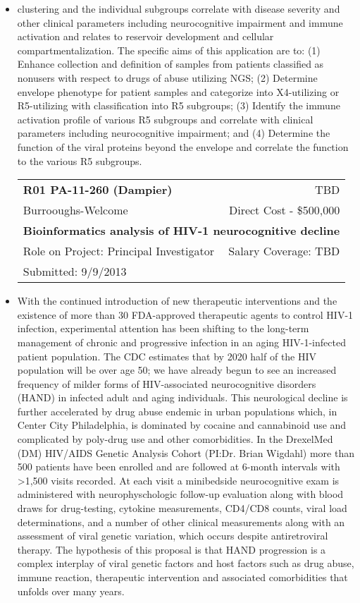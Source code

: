 \documentclass[a4paper,11pt]{article}
\makeatletter
\newenvironment{fullwidth}
    {\par
     \setlength{\@totalleftmargin}{0pt}%
     \setlength{\linewidth}{\hsize}%
     \list{}{\setlength{\leftmargin}{0pt}}
     \item\relax}
    {\endlist}
\makeatother
\begin{document}
\begin{enumerate}
\begin{itemize}
\begin{fullwidth}
clustering and the individual subgroups correlate with disease severity and other clinical parameters including neurocognitive impairment and immune activation and relates to reservoir development and cellular compartmentalization.  The specific aims of this application are to: (1) Enhance collection and definition of samples from patients classified as nonusers with respect to drugs of abuse utilizing NGS; (2) Determine envelope phenotype for patient samples and categorize into X4-utilizing or R5-utilizing with classification into R5 subgroups; (3) Identify the immune activation profile of various R5 subgroups and correlate with clinical parameters including neurocognitive impairment; and (4) Determine the function of the viral proteins beyond the envelope and correlate the function to the various R5 subgroups.
    \end{fullwidth}
    
     \begin{longtable}{lr}
    \textbf{R01 PA-11-260 (Dampier)} & TBD \\
    Burrooughs-Welcome & Direct Cost - \$500,000 \\
    \multicolumn{2}{p{0.973\textwidth}}{\bfseries Bioinformatics analysis of HIV-1 neurocognitive decline} \\
    Role on Project:  Principal Investigator & Salary Coverage: TBD \\
    Submitted: 9/9/2013\\
    \end{longtable}
    \begin{fullwidth}
     With the continued introduction of new therapeutic interventions and the existence of more than 30 FDA-approved therapeutic agents to control HIV-1 infection, experimental attention has been shifting to the long-term management of chronic and progressive infection in an aging HIV-1-infected patient population. The CDC estimates that by 2020 half of the HIV population will be over age 50; we have already begun to see an increased frequency of milder forms of HIV-associated neurocognitive disorders (HAND) in infected adult and aging individuals. This neurological decline is further accelerated by drug abuse endemic in urban populations which, in Center City Philadelphia, is dominated by cocaine and cannabinoid use and complicated by poly-drug use and other comorbidities. In the DrexelMed (DM) HIV/AIDS Genetic Analysis Cohort (PI:Dr. Brian Wigdahl) more than 500 patients have been enrolled and are followed at 6-month intervals with >1,500 visits recorded. At each visit a minibedside neurocognitive exam is administered with neurophyschologic follow-up evaluation along with blood draws for drug-testing, cytokine measurements, CD4/CD8 counts, viral load determinations, and a number of other clinical measurements along with an assessment of viral genetic variation, which occurs despite antiretroviral therapy. The hypothesis of this proposal is that HAND progression is a complex interplay of viral genetic factors and host factors such as drug abuse, immune reaction, therapeutic intervention and associated comorbidities that unfolds over many years. 
    \end{fullwidth}


\end{itemize}
\end{enumerate}
\end{document}
